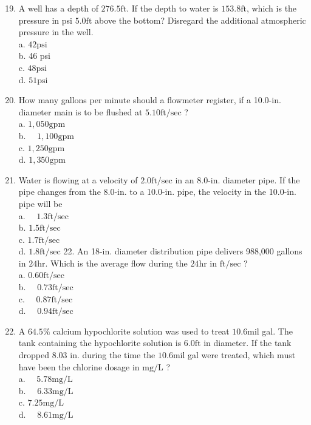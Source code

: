 \documentclass[10pt]{article}
\begin{document}
\begin{enumerate}
  \setcounter{enumi}{18}
  \item A well has a depth of $276.5 \mathrm{ft}$. If the depth to water is $153.8 \mathrm{ft}$, which is the pressure in psi $5.0 \mathrm{ft}$ above the bottom? Disregard the additional atmospheric pressure in the well.\\
a. $42 \mathrm{psi}$\\
b. 46 psi\\
c. $48 \mathrm{psi}$\\
d. $51 \mathrm{psi}$

  \item How many gallons per minute should a flowmeter register, if a 10.0-in. diameter main is to be flushed at $5.10 \mathrm{ft} / \mathrm{sec}$ ?\\
a. $1,050 \mathrm{gpm}$\\
b. $\quad 1,100 \mathrm{gpm}$\\
c. $1,250 \mathrm{gpm}$\\
d. $1,350 \mathrm{gpm}$

  \item Water is flowing at a velocity of $2.0 \mathrm{ft} / \mathrm{sec}$ in an $8.0$-in. diameter pipe. If the pipe changes from the 8.0-in. to a 10.0-in. pipe, the velocity in the 10.0-in. pipe will be\\
a. $\quad 1.3 \mathrm{ft} / \mathrm{sec}$\\
b. $1.5 \mathrm{ft} / \mathrm{sec}$\\
c. $1.7 \mathrm{ft} / \mathrm{sec}$\\
d. $1.8 \mathrm{ft} / \mathrm{sec}$ 22. An 18-in. diameter distribution pipe delivers 988,000 gallons in $24 \mathrm{hr}$. Which is the average flow during the $24 \mathrm{hr}$ in $\mathrm{ft} / \mathrm{sec}$ ?\\
a. $0.60 \mathrm{ft} / \mathrm{sec}$\\
b. $\quad 0.73 \mathrm{ft} / \mathrm{sec}$\\
c. $\quad 0.87 \mathrm{ft} / \mathrm{sec}$\\
d. $\quad 0.94 \mathrm{ft} / \mathrm{sec}$

  \item A $64.5 \%$ calcium hypochlorite solution was used to treat $10.6 \mathrm{mil}$ gal. The tank containing the hypochlorite solution is $6.0 \mathrm{ft}$ in diameter. If the tank dropped $8.03$ in. during the time the $10.6 \mathrm{mil}$ gal were treated, which must have been the chlorine dosage in $\mathrm{mg} / \mathrm{L}$ ?\\
a. $\quad 5.78 \mathrm{mg} / \mathrm{L}$\\
b. $\quad 6.33 \mathrm{mg} / \mathrm{L}$\\
c. $7.25 \mathrm{mg} / \mathrm{L}$\\
d. $\quad 8.61 \mathrm{mg} / \mathrm{L}$


\end{enumerate}
\end{document}
